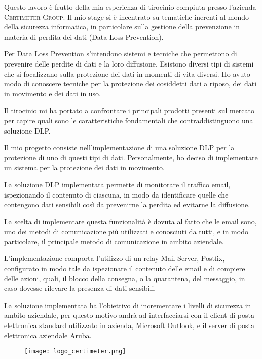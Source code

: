
Questo lavoro è frutto della mia esperienza di tirocinio compiuta presso l’azienda \textsc{Certimeter Group}. Il mio stage si è incentrato su tematiche inerenti al mondo della sicurezza informatica, in particolare sulla gestione della prevenzione in materia di perdita dei dati (Data Loss Prevention).

Per Data Loss Prevention s’intendono sistemi e tecniche che permettono di prevenire delle perdite di dati e la loro diffusione. Esistono diversi tipi di sistemi che si focalizzano sulla protezione dei dati in momenti di vita diversi. 
Ho avuto modo di conoscere tecniche per la protezione dei cosiddetti dati a riposo, dei dati in movimento e dei dati in uso. 

Il tirocinio mi ha portato a confrontare i principali prodotti presenti sul mercato per capire quali sono le caratteristiche fondamentali che contraddistinguono una soluzione DLP.

Il mio progetto consiste nell’implementazione di una soluzione DLP per la protezione di uno di questi tipi di dati. Personalmente, ho deciso di implementare un sistema per la protezione dei dati in movimento.

La soluzione DLP implementata permette di monitorare il traffico email, ispezionando il contenuto di ciascuna, in modo da identificare quelle che contengono dati sensibili così da prevenirne la perdita ed evitarne la diffusione.

La scelta di implementare questa funzionalità è dovuta al fatto che le email sono, uno dei metodi di comunicazione più utilizzati e conosciuti da tutti, e in modo particolare, il principale metodo di comunicazione in ambito aziendale.

L’implementazione comporta l’utilizzo di un relay Mail Server, Postfix, configurato in modo tale da ispezionare il contenuto delle email e di compiere delle azioni, quali, il blocco della consegna, o la quarantena, del messaggio, in caso dovesse rilevare la presenza di dati sensibili.

La soluzione implementata ha l’obiettivo di incrementare i livelli di sicurezza in ambito aziendale, per questo motivo andrà ad interfacciarsi con il client di posta elettronica standard utilizzato in azienda, Microsoft Outlook, e il server di posta elettronica aziendale Aruba.




\begin{figure}[b]
    \centering
    \texttt{[image: logo\_certimeter.png]}
\end{figure}
